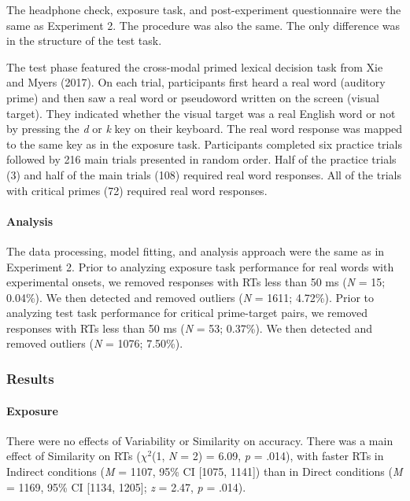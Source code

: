 \documentclass[
  12pt,
  twoside]{article}
\begin{document}
The headphone check, exposure task, and post-experiment questionnaire were the same as Experiment 2.
The procedure was also the same.
The only difference was in the structure of the test task.

The test phase featured the cross-modal primed lexical decision task from Xie and Myers (2017).
On each trial, participants first heard a real word (auditory prime) and then saw a real word or pseudoword written on the screen (visual target).
They indicated whether the visual target was a real English word or not by pressing the \emph{d} or \emph{k} key on their keyboard.
The real word response was mapped to the same key as in the exposure task.
Participants completed six practice trials followed by 216 main trials presented in random order.
Half of the practice trials (3) and half of the main trials (108) required real word responses.
All of the trials with critical primes (72) required real word responses.

\hypertarget{analysis}{%
\paragraph{Analysis}\label{analysis}}

The data processing, model fitting, and analysis approach were the same as in Experiment 2.
Prior to analyzing exposure task performance for real words with experimental onsets, we removed responses with RTs less than 50 ms (\emph{N} = 15; 0.04\%).
We then detected and removed outliers (\emph{N} = 1611; 4.72\%).
Prior to analyzing test task performance for critical prime-target pairs, we removed responses with RTs less than 50 ms (\emph{N} = 53; 0.37\%).
We then detected and removed outliers (\emph{N} = 1076; 7.50\%).

\hypertarget{results-2}{%
\subsubsection{Results}\label{results-2}}

\hypertarget{exposure-2}{%
\paragraph{Exposure}\label{exposure-2}}

There were no effects of Variability or Similarity on accuracy.
There was a main effect of Similarity on RTs (\(\chi^2\)(1, \emph{N} = 2) = 6.09, \emph{p} = .014), with faster RTs in Indirect conditions (\emph{M} = 1107, 95\% CI {[}1075, 1141{]}) than in Direct conditions (\emph{M} = 1169, 95\% CI {[}1134, 1205{]}; \emph{z} = 2.47, \emph{p} = .014).
\end{document}
